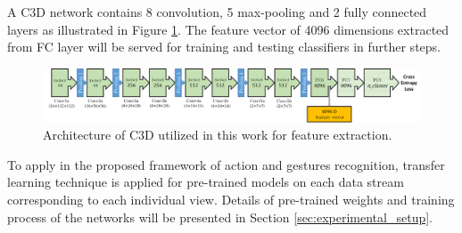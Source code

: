     A C3D network contains 8 convolution, 5 max-pooling and 2 fully connected layers as illustrated in Figure \ref{fig:C3D}. 
    The feature vector of 4096 dimensions extracted from FC layer will be served for training and testing classifiers in further steps.

    \begin{figure}[htbp]
        \centering
        \includegraphics[width=1\linewidth]{figs/C3D.png}
        \caption{Architecture of C3D utilized in this work for feature extraction.}
        \label{fig:C3D}
    \end{figure}

    To apply in the proposed framework of action and gestures recognition, transfer learning technique is applied for pre-trained models on each data stream corresponding to each individual view.
    Details of pre-trained weights and training process of the networks will be presented in Section \ref{sec:experimental_setup}.
